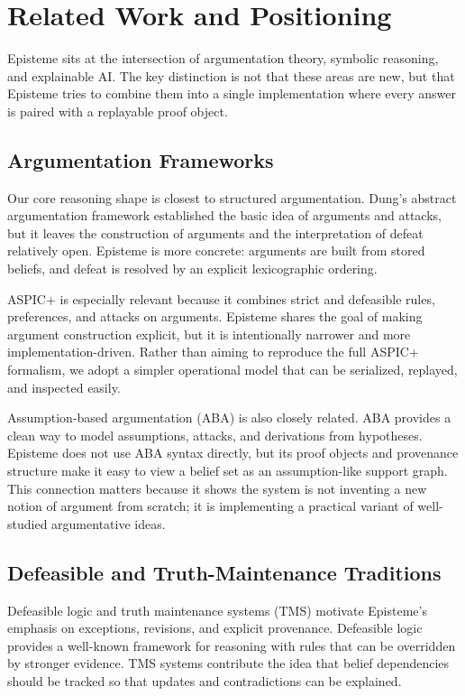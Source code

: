 \documentclass[11pt]{article}
\begin{document}
\section{Related Work and Positioning}
Episteme sits at the intersection of argumentation theory, symbolic reasoning,
and explainable AI. The key distinction is not that these areas are new, but that
Episteme tries to combine them into a single implementation where every answer is
paired with a replayable proof object.

\subsection{Argumentation Frameworks}
Our core reasoning shape is closest to structured argumentation. Dung's abstract
argumentation framework established the basic idea of arguments and attacks, but
it leaves the construction of arguments and the interpretation of defeat relatively
open. Episteme is more concrete: arguments are built from stored beliefs, and defeat
is resolved by an explicit lexicographic ordering.

ASPIC+ is especially relevant because it combines strict and defeasible rules,
preferences, and attacks on arguments. Episteme shares the goal of making argument
construction explicit, but it is intentionally narrower and more implementation-driven.
Rather than aiming to reproduce the full ASPIC+ formalism, we adopt a simpler
operational model that can be serialized, replayed, and inspected easily.

Assumption-based argumentation (ABA) is also closely related. ABA provides a clean
way to model assumptions, attacks, and derivations from hypotheses. Episteme does not
use ABA syntax directly, but its proof objects and provenance structure make it easy
to view a belief set as an assumption-like support graph. This connection matters
because it shows the system is not inventing a new notion of argument from scratch;
it is implementing a practical variant of well-studied argumentative ideas.

\subsection{Defeasible and Truth-Maintenance Traditions}
Defeasible logic and truth maintenance systems (TMS) motivate Episteme's emphasis on
exceptions, revisions, and explicit provenance. Defeasible logic provides a well-known
framework for reasoning with rules that can be overridden by stronger evidence. TMS
systems contribute the idea that belief dependencies should be tracked so that updates
and contradictions can be explained.
\end{document}
